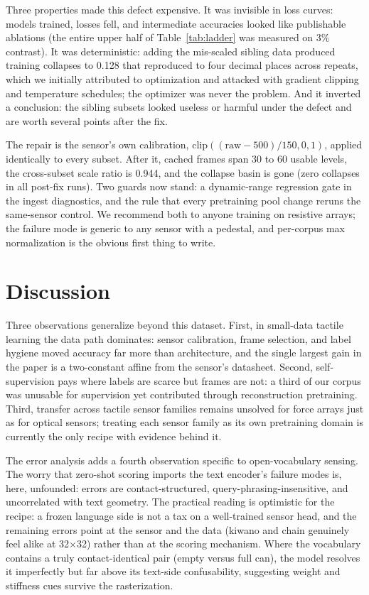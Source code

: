 \documentclass[conference]{IEEEtran}
\begin{document}
Three properties made this defect expensive. It was invisible in loss curves: models
trained, losses fell, and intermediate accuracies looked like publishable ablations (the
entire upper half of Table~\ref{tab:ladder} was measured on 3\% contrast). It was
deterministic: adding the mis-scaled sibling data produced training collapses to 0.128
that reproduced to four decimal places across repeats, which we initially attributed to
optimization and attacked with gradient clipping and temperature schedules; the optimizer
was never the problem. And it inverted a conclusion: the sibling subsets looked useless or
harmful under the defect and are worth several points after the fix.

The repair is the sensor's own calibration, $\mathrm{clip}((\mathrm{raw}-500)/150, 0, 1)$,
applied identically to every subset. After it, cached frames span 30 to 60 usable levels,
the cross-subset scale ratio is 0.944, and the collapse basin is gone (zero collapses in
all post-fix runs). Two guards now stand: a dynamic-range regression gate in the ingest
diagnostics, and the rule that every pretraining pool change reruns the same-sensor
control. We recommend both to anyone training on resistive arrays; the failure mode is
generic to any sensor with a pedestal, and per-corpus max normalization is the obvious
first thing to write.

\section{Discussion}
Three observations generalize beyond this dataset. First, in small-data tactile learning
the data path dominates: sensor calibration, frame selection, and label hygiene moved
accuracy far more than architecture, and the single largest gain in the paper is a
two-constant affine from the sensor's datasheet. Second, self-supervision pays where
labels are scarce but frames are not: a third of our corpus was unusable for supervision
yet contributed through reconstruction pretraining. Third, transfer across tactile sensor
families remains unsolved for force arrays just as for optical sensors; treating each
sensor family as its own pretraining domain is currently the only recipe with evidence
behind it.

The error analysis adds a fourth observation specific to open-vocabulary sensing. The
worry that zero-shot scoring imports the text encoder's failure modes is, here,
unfounded: errors are contact-structured, query-phrasing-insensitive, and uncorrelated
with text geometry. The practical reading is optimistic for the recipe: a frozen language
side is not a tax on a well-trained sensor head, and the remaining errors point at the
sensor and the data (kiwano and chain genuinely feel alike at 32$\times$32) rather than at
the scoring mechanism. Where the vocabulary contains a truly contact-identical pair
(empty versus full can), the model resolves it imperfectly but far above its text-side
confusability, suggesting weight and stiffness cues survive the rasterization.
\end{document}
